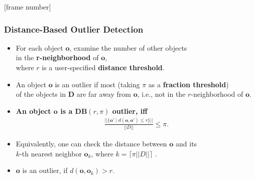 \documentclass[aspectratio=169,t,xcolor=dvipsnames]{beamer}
\begin{document}
{
  [frame number]
  \begin{frame}
  \frametitle{Distance-Based Outlier Detection }
  	\begin{itemize}
  		\item For each object $\mathbf{o}$, examine the number of other objects \\
      in the \textbf{r-neighborhood} of $\mathbf{o}$, \\
      where $r$ is a user-specified \textbf{distance threshold}.
  		\item An object $\mathbf{o}$ is an outlier if most (taking $\pi$ as a \textbf{fraction threshold}) \\
      of the objects in $\mathbf{D}$ are far away from $\mathbf{o}$, i.e., not in the $r$-neighborhood of $\mathbf{o}$.
  	\end{itemize}
  	\begin{itemize}
  		\item \textbf{An object $\mathbf{o}$ is a $\mathbf{DB}(r, \pi)$ outlier, iff}
      \begin{align}
        \frac{||\{\mathbf{o'} \; \vert \; d(\mathbf{o},\mathbf{o'}) \leq r \}|| }{||D||} \leq \pi.
      \end{align}
  		\item Equivalently, one can check the distance between $\mathbf{o}$ and its \\
      $k$-th nearest neighbor $\mathbf{o}_k$, where $k=\lceil \pi ||D||\rceil$                       . \\
  		\item $\mathbf{o}$ is an outlier, if $d(\mathbf{o}, \mathbf{o}_k) > r$.
  	\end{itemize}
  \end{frame}
}
\end{document}
